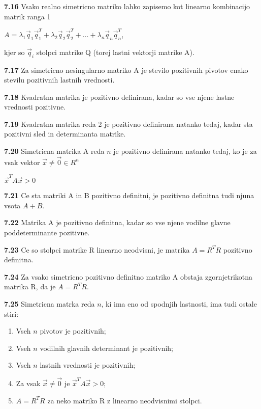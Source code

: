 \documentclass{article}
\begin{document}
\begin{multicols}{4}
	\textbf{7.16} Vsako realno simetricno matriko lahko zapisemo kot linearno kombinacijo matrik ranga 1
	\begin{center}
		\begin{math}
			A = \lambda_{1}\vec{q}_{1}\vec{q}_{1}^{T} + \lambda_{2}\vec{q}_{2}\vec{q}_{2}^{T} +
			\dots + \lambda_{n}\vec{q}_{n}\vec{q}_{n}^{T}
		\end{math},
	\end{center}
	kjer so $\vec{q}_{i}$ stolpci matrike Q (torej lastni vektorji matrike A).

	\textbf{7.17} Za simetricno nesingularno matriko A je stevilo pozitivnih pivotov enako
	stevilu pozitivnih lastnih vrednosti.

	\textbf{7.18} Kvadratna matrika je pozitivno definirana, kadar so vse njene lastne vrednosti pozitivne.

	\textbf{7.19} Kvadratna matrika reda 2 je pozitivno definirana natanko tedaj, kadar sta
	pozitivni sled in determinanta matrike.

	\textbf{7.20} Simetricna matrika A reda $n$ je pozitivno definirana natanko tedaj, ko je za vsak
	vektor $\vec{x} \neq \vec{0} \in R^{n}$
	\begin{center}
		$\vec{x}^{T}A\vec{x} > 0$
	\end{center}

	\textbf{7.21} Ce sta matriki A in B pozitivno definitni, je pozitivno definitna tudi
	njuna vsota $A + B$.

	\textbf{7.22} Matrika A je pozitivno definitna, kadar so vse njene vodilne glavne poddeterminante pozitivne.

	\textbf{7.23} Ce so stolpci matrike R linearno neodvisni, je matrika $A = R^{T}R$ pozitivno definitna.

	\textbf{7.24} Za vsako simetricno pozitivno definitno matriko A obstaja zgornjetrikotna matrika R, da
	je $A = R^{T}R$.

	\textbf{7.25} Simetricna matrka reda $n$, ki ima eno od spodnjih lastnosti, ima tudi ostale stiri:
	\begin{enumerate}
		\item Vseh $n$ pivotov je pozitivnih;
		\item Vseh $n$ vodilnih glavnih determinant je pozitivnih;
		\item Vseh $n$ lastnih vrednosti je pozitivnih;
		\item Za vsak $\vec{x} \neq \vec{0}$ je $\vec{x}^{T}A\vec{x} > 0$;
		\item $A= R^{T}R$ za neko matriko R z linearno neodvisnimi stolpci.
	\end{enumerate}


\end{multicols}
\end{document}
